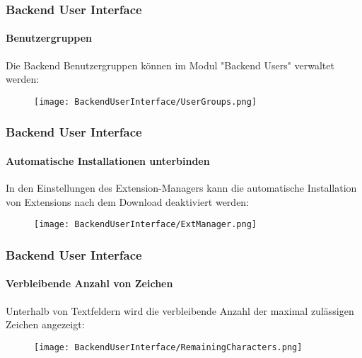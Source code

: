 \begin{frame}[fragile]
	\frametitle{Backend User Interface}
	\framesubtitle{Benutzergruppen}

	Die Backend Benutzergruppen können im Modul "Backend Users" verwaltet werden:

	\begin{figure}
		\texttt{[image: BackendUserInterface/UserGroups.png]}
	\end{figure}

\end{frame}

\begin{frame}[fragile]
	\frametitle{Backend User Interface}
	\framesubtitle{Automatische Installationen unterbinden}

	In den Einstellungen des Extension-Managers kann die automatische Installation
	von Extensions nach dem Download deaktiviert werden:

	\begin{figure}
		\texttt{[image: BackendUserInterface/ExtManager.png]}
	\end{figure}

\end{frame}

\begin{frame}[fragile]
	\frametitle{Backend User Interface}
	\framesubtitle{Verbleibende Anzahl von Zeichen}

	Unterhalb von Textfeldern wird die verbleibende Anzahl der maximal zulässigen
	Zeichen angezeigt:

	\begin{figure}
		\texttt{[image: BackendUserInterface/RemainingCharacters.png]}
	\end{figure}

\end{frame}

